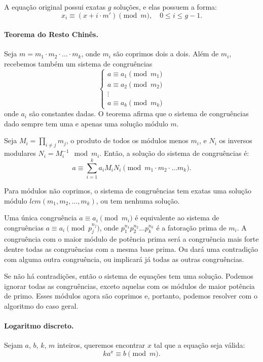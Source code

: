 A equação original possui exatas $g$ soluções, e elas possuem a forma:
$$x_i \equiv (x + i\cdot m') \pmod m, \quad 0 \leq i \leq g-1.$$

\paragraph{Teorema do Resto Chinês.} Seja $m=m_1\cdot m_2 \cdot \dots \cdot m_k$, onde $m_i$ são coprimos dois a dois. Além de $m_i$, recebemos também um sistema de congruências
$$
\begin{cases}
    a \equiv a_1 \pmod {m_1} \\
    a \equiv a_2 \pmod {m_2} \\
    \vdots \\
    a \equiv a_k \pmod {m_k}
\end{cases}
$$
onde $a_i$ são constantes dadas. O teorema afirma que o sistema de congruências dado sempre tem uma e apenas uma solução módulo $m$.

Seja $M_i = \prod_{i \neq j} m_j$, o produto de todos os módulos menos $m_i$, e $N_i$ os inversos modulares $N_i = M_i^{-1} \mod m_i$. Então, a solução do sistema de congruências é:
$$a \equiv \sum_{i=1}^{k} a_iM_iN_i \pmod{m_1\cdot m_2 \cdot \dots m_k}.$$

Para módulos não coprimos, o sistema de congruências tem exatas uma solução módulo $lcm(m_1,m_2,\dots,m_k)$, ou tem nenhuma solução.

Uma única congruência $a \equiv a_i \pmod{m_i}$ é equivalente ao sistema de congruências $a \equiv a_i \pmod{p_j^{n_j}}$, onde $p_1^{n_1}p_2^{n_2}\dots p_k^{n_k}$ é a fatoração prima de $m_i$. A congruência com o maior módulo de potência prima será a congruência mais forte dentre todas as congruências com a mesma base prima. Ou dará uma contradição com alguma outra congruência, ou implicará já todas as outras congruências.

Se não há contradições, então o sistema de equações tem uma solução. Podemos ignorar todas as congruências, exceto aquelas com os módulos de maior potência de primo. Esses módulos agora são coprimos e, portanto, podemos resolver com o algoritmo do caso geral.

\paragraph{Logaritmo discreto.} Sejam $a$, $b$, $k$, $m$ inteiros, queremos encontrar $x$ tal que a equação seja válida:
$$ka^x \equiv b \pmod{m}.$$

